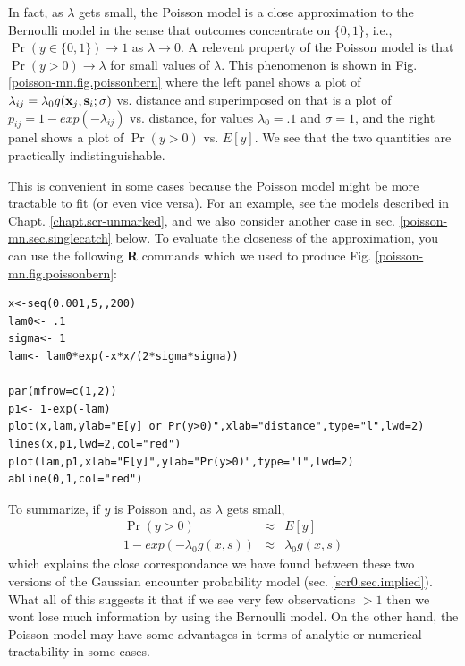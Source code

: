 In fact, as $\lambda$ gets small, the Poisson model is a close approximation
to the Bernoulli model in the sense that outcomes concentrate on
$\{0,1\}$, i.e.,  $\Pr(y\in \{0,1\})
\rightarrow 1$ as $\lambda \rightarrow 0$.
A relevent property of the Poisson model
is that
$\Pr(y>0) \rightarrow \lambda$
for small values of $\lambda$.
This phenomenon is shown in  Fig.
\ref{poisson-mn.fig.poissonbern} where
the left panel shows a plot of $\lambda_{ij}=\lambda_{0}g({\bf
  x}_{j},{\bf s}_{i};\sigma)$ vs. distance and
superimposed on that is a plot of $p_{ij}=1-exp(-\lambda_{ij})$ vs. distance, for values
$\lambda_{0} = .1$ and $\sigma = 1$, and the right panel shows a plot of
$\Pr(y>0)$ vs. $E[y]$. We see that the two quantities are
practically indistinguishable.

This is convenient in some cases because the Poisson model might be
more tractable to fit (or even vice versa). For an example, see the
models described in Chapt. \ref{chapt.scr-unmarked}, and we also
consider another case in sec. \ref{poisson-mn.sec.singlecatch}
below. To evaluate the closeness of the approximation, you can use the
following {\bf R} commands which we used to produce
Fig. \ref{poisson-mn.fig.poissonbern}: {\small
\begin{verbatim}
x<-seq(0.001,5,,200)
lam0<- .1
sigma<- 1
lam<- lam0*exp(-x*x/(2*sigma*sigma))

par(mfrow=c(1,2))
p1<- 1-exp(-lam)
plot(x,lam,ylab="E[y] or Pr(y>0)",xlab="distance",type="l",lwd=2)
lines(x,p1,lwd=2,col="red")
plot(lam,p1,xlab="E[y]",ylab="Pr(y>0)",type="l",lwd=2)
abline(0,1,col="red")
\end{verbatim}
}

To summarize, if $y$ is Poisson and, as $\lambda$ gets small,
\begin{eqnarray*}
\Pr(y>0)  & \approx & E[y]  \\
1-exp(-\lambda_{0} g(x,s)) &\approx &  \lambda_{0} g(x,s)
\end{eqnarray*}
which explains the close correspondance we have found between these
two versions of the Gaussian encounter probability model
(sec. \ref{scr0.sec.implied}).  What all of this suggests it that if
we see very few observations $>1$ then we wont lose much information
by using the Bernoulli model. On the other hand, the Poisson model may
have some advantages in terms of analytic or numerical tractability in
some cases.

